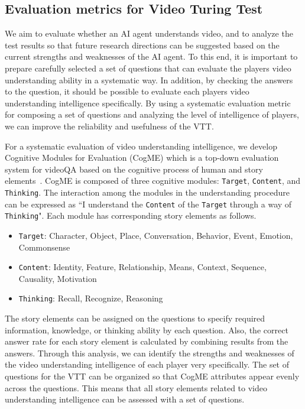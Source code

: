 \documentclass[letterpaper]{article} %
\begin{document}
\subsection{Evaluation metrics for Video Turing Test}
We aim to evaluate whether an AI agent understands video, and to analyze the test results so that future research directions can be suggested based on the current strengths and weaknesses of the AI agent.
To this end, it is important to prepare carefully selected a set of questions that can evaluate the players video understanding ability in a systematic way.
In addition, by checking the answers to the question, it should be possible to evaluate each players video understanding intelligence specifically.
By using a systematic evaluation metric for composing a set of questions and analyzing the level of intelligence of players, we can improve the reliability and usefulness of the VTT.

For a systematic evaluation of video understanding intelligence, we develop Cognitive Modules for Evaluation (CogME) which is a top-down evaluation system for videoQA based on the cognitive process of human and story elements~\cite{shin2021cogme}.
CogME is composed of three cognitive modules: \texttt{Target}, \texttt{Content}, and \texttt{Thinking}. The interaction among the modules in the understanding procedure can be expressed as ``I understand the \texttt{Content} of the \texttt{Target} through a way of \texttt{Thinking}". Each module has corresponding story elements as follows.

\begin{itemize}
    \item \texttt{Target}: Character, Object, Place, Conversation, Behavior, Event, Emotion, Commonsense
    \item \texttt{Content}: Identity, Feature, Relationship, Means, Context, Sequence, Causality, Motivation
    \item \texttt{Thinking}: Recall, Recognize, Reasoning
\end{itemize}

The story elements can be assigned on the questions to specify required information, knowledge, or thinking ability by each question. Also, the correct answer rate for each story element is calculated by combining results from the answers. Through this analysis, we can identify the strengths and weaknesses of the video understanding intelligence of each player very specifically.
The set of questions for the VTT can be organized so that CogME attributes appear evenly across the questions. This means that all story elements related to video understanding intelligence can be assessed with a set of questions.
\end{document}

